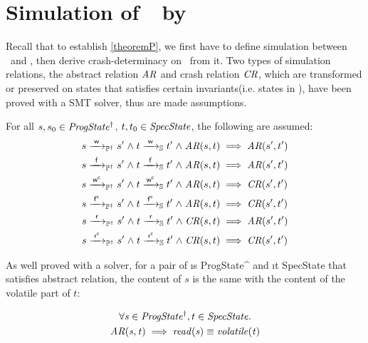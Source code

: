 
\section{Simulation of~\ProgInv\ by~\Spec}
\label{sec:sim}
Recall that to establish \cref{theoremP}, we first have to define simulation between \Spec\ and \Prog, then derive crash-determinacy on \Prog\ from it. Two types of simulation relations, the abstract relation $\mathit{AR}$ and crash relation $\mathit{CR}$, which are transformed or preserved on states that satisfies certain invariants(i.e. states in \ProgInv), have been proved with a SMT solver, thus are made assumptions.
\begin{assumption}\label{PerOpCorrect}
	For all $s, s_0 \in \mathit{ProgState^\dagger}$, $t, t_0 \in \mathit{SpecState}$, the following are assumed:
\begin{align*}
s \ttPI{\awa{\actw}{\actw }} s' \conj t \ttS{\awa{\actw}{\actw }} t' \conj \i{AR}(s, t) &\implies \i{AR}(s', t')\\
s \ttPI{\awa{\actw}{\actf }} s' \conj t \ttS{\awa{\actw}{\actf }} t' \conj \i{AR}(s, t) &\implies \i{AR}(s', t')\\
s \ttPI{\awa{\actw}{\actwc}} s' \conj t \ttS{\awa{\actw}{\actwc}} t' \conj \i{AR}(s, t) &\implies \i{CR}(s', t')\\
s \ttPI{\awa{\actw}{\actfc}} s' \conj t \ttS{\awa{\actw}{\actfc}} t' \conj \i{AR}(s, t) &\implies \i{CR}(s', t')\\
s \ttPI{\awa{\actw}{\actr }} s' \conj t \ttS{\awa{\actw}{\actr }} t' \conj \i{CR}(s, t) &\implies \i{AR}(s', t')\\
s \ttPI{\awa{\actw}{\actrc}} s' \conj t \ttS{\awa{\actw}{\actrc}} t' \conj \i{CR}(s, t) &\implies \i{CR}(s', t')
\end{align*}
\end{assumption}
As well proved with a solver, for a pair of \i{s \in ProgState^\dagger} and \i{t \in SpecState} that satisfies abstract relation, the content of $s$ is the same with the content of the volatile part of $t$:
\begin{assumption}\label{ObsEquiv}
	\begin{multline*}
	 \forall \mathit{s} \in \mathit{ProgState^\dagger},t \in \mathit{SpecState} \ldotp \\
	 \mathit{AR(s, t)} \implies \mathit{read(s)} \equiv \mathit{volatile(t)} \\
	\end{multline*}
\end{assumption}
